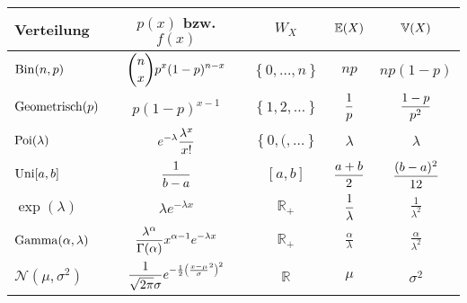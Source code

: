 \begin{tabular}[]{lcccc}
	\toprule
	Verteilung&$p(x)$ bzw. $f(x)$&$W_{X}$&$\operatorname{\mathbb E}(X)$&$\operatorname{\mathbb V}(X)$\\
	\midrule
	$\operatorname{Bin}(n,p)$&$\displaystyle{n\choose x}p^{x}(1-p)^{n-x}$&$\left\{ 0,\ldots,n \right\}$&$np$&$np\left( 1-p \right)$\\
	$\operatorname{Geometrisch}(p)$&$p(1-p)^{x-1}$&$\left\{ 1,2,\ldots \right\}$&$\displaystyle\frac{1}{p}$&$\displaystyle\frac{1-p}{p^2}$\\
	$\operatorname{Poi}(\lambda)$&$\displaystyle e^{-\lambda}\frac{\lambda^x}{x!}$&$\left\{ 0,(,\ldots \right\}$&$\lambda$&$\lambda$\\
	$\operatorname{Uni}[a,b]$&$\displaystyle\frac{1}{b-a}$&$[a,b]$&$\displaystyle\frac{a+b}{2}$&$\displaystyle \frac{(b-a)^2}{12}$\\[1em]
	$\exp(\lambda)$&$\lambda e^{-\lambda x}$& $\mathbb{R}_{+}$&$\displaystyle \frac{1}{\lambda}$&$\frac{1}{\lambda^2}$\\
	$\operatorname{Gamma}(\alpha,\lambda)$&$\displaystyle \frac{\lambda^{\alpha}}{\Gamma(\alpha)}x^{\alpha-1}e^{-\lambda x}$&$\mathbb{R}_{+}$&$\frac{\alpha}{\lambda}$&$\frac{\alpha}{\lambda^2}$\\
	$\mathcal{N}(\mu,\sigma^2)$&$\displaystyle \frac{1}{\sqrt{2\pi}\sigma}e^{-\frac{1}{2}\left(\frac{x-\mu}{\sigma}^2 \right)^2}$&$\mathbb{R}$&$\mu$&$\sigma^2$\\
	\bottomrule
\end{tabular}
